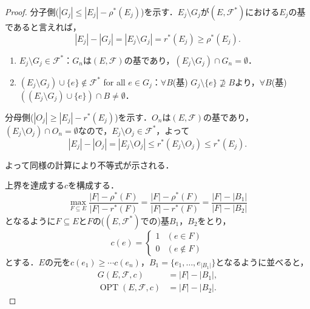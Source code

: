 \documentclass[xelatex,ja=standard,a4paper,14pt,everyparhook=compat]{bxjsarticle}
\newcommand{\mcF}{\mathcal{F}}
\DeclareMathOperator{\OPT}{OPT}
\theoremstyle{definition}
\begin{document}
\begin{proof}
    分子側($|G_j| \leq |E_j| - \rho^*(E_j)$)を示す．$E_j \setminus G_j$が$(E,\mcF^*)$における$E_j$の基であると言えれば， \begin{equation*}
        |E_j| - |G_j| = |E_j \setminus G_j| = r^*(E_j) \geq \rho^*(E_j).
    \end{equation*}
    \begin{enumerate}
        \item $E_j \setminus G_j \in \mcF^*$：$G_n$は$(E,\mcF)$の基であり，$(E_j \setminus G_j) \cap G_n = \emptyset$．
        \item $(E_j \setminus G_j) \cup \{e\} \notin \mcF^*$ for all $e \in G_j$：$\forall B$(基) $G_j \setminus \{e\} \not\supseteq B$より，$\forall B$(基) $((E_j \setminus G_j) \cup \{e\}) \cap B \neq \emptyset$．
    \end{enumerate}

    分母側($|O_j| \geq |E_j| - r^*(E_j)$)を示す．$O_n$は$(E,\mcF)$の基であり，$(E_j \setminus O_j) \cap O_n = \emptyset$なので，$E_j \setminus O_j \in \mcF^*$，よって \begin{equation*}
        |E_j| - |O_j| = |E_j \setminus O_j| \leq r^*(E_j \setminus O_j) \leq r^*(E_j).
    \end{equation*}

    よって同様の計算により不等式が示される．

    上界を達成する$c$を構成する． \begin{equation*}
        \max_{F \subseteq E} \frac{|F| - \rho^*(F)}{|F| - r^*(F)} = \frac{|F| - \rho^*(F)}{|F| - r^*(F)} = \frac{|F| - |B_1|}{|F| - |B_2|}
    \end{equation*}
    となるように$F \subseteq E$と$F$の($(E,\mcF^*)$での)基$B_1$，$B_2$をとり， \begin{equation*}
        c(e) = \begin{cases}
            1 & (e \in F) \\
            0 & (e \notin F)
        \end{cases}
    \end{equation*}
    とする．$E$の元を$c(e_1) \geq \cdots c(e_n)$，$B_1 = \{e_1,\ldots,e_{|B_1|}\}$となるように並べると， \begin{align*}
        G(E,\mcF,c) &= |F|-|B_1|, \\
        \OPT(E,\mcF,c) &= |F|-|B_2|.
    \end{align*}
\end{proof}

\newpage
\end{document}
